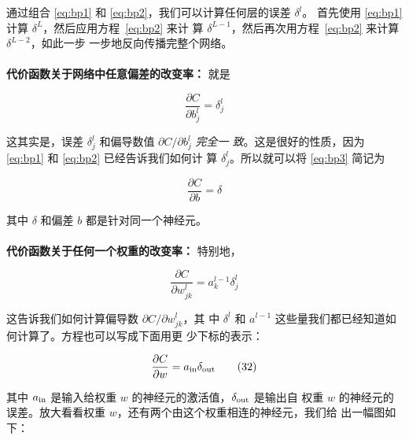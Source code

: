 通过组合 \eqref{eq:bp1} 和 \eqref{eq:bp2}，我们可以计算任何层的误差 $\delta^l$。
首先使用 \eqref{eq:bp1} 计算 $\delta^L$，然后应用方程~\eqref{eq:bp2} 来计
算 $\delta^{L-1}$，然后再次用方程~\eqref{eq:bp2} 来计算 $\delta^{L-2}$，如此一步
一步地反向传播完整个网络。
\\
\\
\textbf{代价函数关于网络中任意偏差的改变率：} 就是

\begin{equation}
  \frac{\partial C}{\partial b^l_j} = \delta^l_j
  \label{eq:bp3}\tag{BP3}
\end{equation}

这其实是，误差 $\delta^l_j$ 和偏导数值 $\partial C / \partial b^l_j$ \emph{完全一
  致}。这是很好的性质，因为 \eqref{eq:bp1} 和 \eqref{eq:bp2} 已经告诉我们如何计
算 $\delta^l_j$。所以就可以将 \eqref{eq:bp3} 简记为

\begin{equation}
  \frac{\partial C}{\partial b} = \delta
  \label{eq:31}\tag{31}
\end{equation}

其中 $\delta$ 和偏差 $b$ 都是针对同一个神经元。
\\
\\
\textbf{代价函数关于任何一个权重的改变率：} 特别地，

\begin{equation}  
  \frac{\partial C}{\partial w^l_{jk}} = a^{l-1}_k \delta^l_j
  \label{eq:bp4}\tag{BP4}
\end{equation}

这告诉我们如何计算偏导数 $\partial C/\partial w_{jk}^l$，其
中 $\delta^l$ 和 $a^{l-1}$ 这些量我们都已经知道如何计算了。方程也可以写成下面用更
少下标的表示：

\begin{equation}
  \frac{\partial
    C}{\partial w} = a_{\rm in} \delta_{\rm out}
  \label{eq:32}\tag{32}
\end{equation}

其中 $a_{\rm in}$ 是输入给权重 $w$ 的神经元的激活值，$\delta_{\rm out}$ 是输出自
权重 $w$ 的神经元的误差。放大看看权重 $w$，还有两个由这个权重相连的神经元，我们给
出一幅图如下：

\begin{center}
\end{center}

